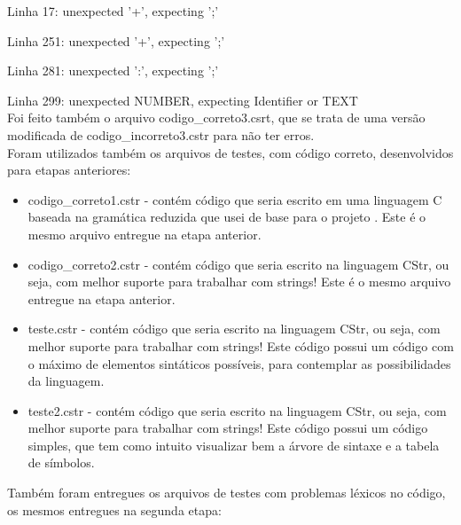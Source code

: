 \documentclass[12pt]{article}
\begin{document}
Linha 17: unexpected '+', expecting ';'

Linha 251: unexpected '+', expecting ';'

Linha 281: unexpected ':', expecting ';'

Linha 299: unexpected NUMBER, expecting Identifier or TEXT\\

Foi feito também o arquivo codigo\_correto3.csrt, que se trata de uma versão modificada de codigo\_incorreto3.cstr para não ter erros.\\

Foram utilizados também os arquivos de testes, com código correto, desenvolvidos para etapas anteriores:

\begin{itemize}
	\item codigo\_correto1.cstr - contém código que seria escrito em uma linguagem C baseada na gramática reduzida que usei de base para o projeto \cite{minic}. Este é o mesmo arquivo entregue na etapa anterior.
	\item codigo\_correto2.cstr - contém código que seria escrito na linguagem CStr, ou seja, com melhor suporte para trabalhar com strings! Este é o mesmo arquivo entregue na etapa anterior.
	\item teste.cstr - contém código que seria escrito na linguagem CStr, ou seja, com melhor suporte para trabalhar com strings! Este código possui um código com o máximo de elementos sintáticos possíveis, para contemplar as possibilidades da linguagem.
	\item teste2.cstr - contém código que seria escrito na linguagem CStr, ou seja, com melhor suporte para trabalhar com strings! Este código possui um código simples, que tem como intuito visualizar bem a árvore de sintaxe e a tabela de símbolos.\\
\end{itemize}

Também foram entregues os arquivos de testes com problemas léxicos no código, os mesmos entregues na segunda etapa:
\end{document}
